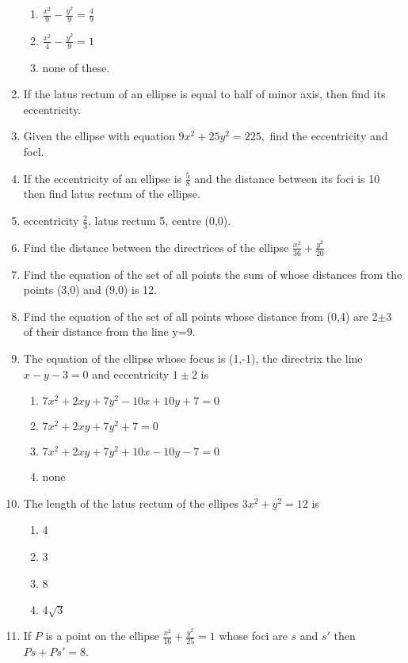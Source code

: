 \begin{enumerate}[label=\thesection.\arabic*,ref=\thesection.\theenumi,resume*]
\begin{enumerate}
	\item  $\frac{x^2}{9}-\frac{y^2}{9}=\frac{4}{9}$
	\item  $\frac{x^2}{4}-\frac{y^2}{9}=1$
\item  none of these.
\end{enumerate}
 \item If the latus rectum of an ellipse is equal to half of minor axis, then find its eccentricity.
 \item Given the ellipse with equation $9x^2+25y^2=225,$ find the eccentricity and focl.
 \item If the eccentricity of an ellipse is $\frac{5}{8}$ and  the distance between its foci is 10 then find latus rectum of the ellipse.
 \item eccentricity $\frac{2}{3}$, latus rectum 5, centre  (0,0).
 \item Find the distance between the directrices of the ellipse $\frac{x^2}{36}+\frac{y^2}{20}$
\item Find the equation of the set of all points the sum of whose distances  from the points (3,0) and (9,0) is 12.
\item Find the equation of the set of all points whose distance from (0,4) are 2$\pm$3 of their distance from the line y=9.
\item The equation of the ellipse whose focus is (1,-1), the directrix the line $x-y-3
=0$ and eccentricity $1 \pm 2$ is
\begin{enumerate}
\item $7x^2+2xy+7y^2-10x+10y+7=0$
\item $7x^2+2xy+7y^2+7=0$
\item $7x^2+2xy+7y^2+10x-10y-7=0$ 
\item none
\end{enumerate}
\item The length of the latus rectum of the ellipes $3x^2+y^2=12$ is
\begin{enumerate}
\item 4
\item 3
\item 8
\item $4\sqrt{3}$
\end{enumerate}
\item If ${P}$ is a point on the ellipse $\frac{x^2}{16}+\frac{y^2}{25}=1$ whose foci  are $s$ and $s'$ then $Ps +Ps'=8$.
\end{enumerate}
